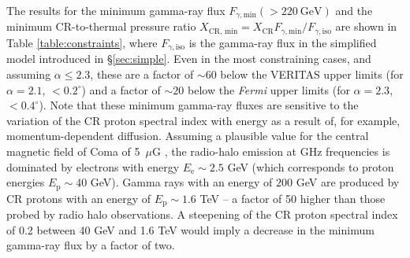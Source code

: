 \documentclass[12pt,manuscript]{aastex}
\def\C#1{#1}
\def\Fermi{{\em Fermi}\xspace}
\newcommand{\rmn}{\mathrm}
\newcommand{\CR}{\mathrm{CR}}
\begin{document}
The results for the minimum gamma-ray flux $F_{\gamma,\rmn{min}}(>220~\rmn{GeV})$ and the minimum
CR-to-thermal pressure ratio $X_{\CR,\,\rmn{min}} = X_\CR F_{\gamma,\rmn{min}}/F_{\gamma,\rmn{iso}}$
are shown in Table \ref{table:constraints}, where $F_{\gamma,\rmn{iso}}$ is the gamma-ray flux in
the simplified model introduced in \S\ref{sec:simple}. \C{Even in the most constraining cases, and
  assuming $\alpha\leq 2.3$, these are a factor of $\sim 60$ below the VERITAS upper limits (for
  $\alpha=2.1$, $<0.2^{\circ}$) and a factor of $\sim 20$ below the \Fermi upper limits (for
  $\alpha=2.3$, $<0.4^{\circ}$)}. Note that these minimum gamma-ray fluxes are sensitive to the
variation of the CR proton spectral index with energy as a result of, for example,
momentum-dependent diffusion. Assuming a plausible value for the central magnetic field of Coma of
5~$\mu$G \citep{article:Bonafede_etal:2010}, the radio-halo emission at GHz frequencies is dominated
by electrons with energy $E_\rmn{e} \sim 2.5$ GeV (which corresponds to proton energies $E_\rmn{p}
\sim 40$ GeV). Gamma rays with an energy of $200$ GeV are produced by CR protons with an energy of
$E_\rmn{p} \sim 1.6$ TeV -- a factor of 50 higher than those probed by radio halo observations. A
steepening of the CR proton spectral index of 0.2 between 40 GeV and 1.6 TeV would imply a decrease
in the minimum gamma-ray flux by a factor of two.

%
%
 
\end{document}
